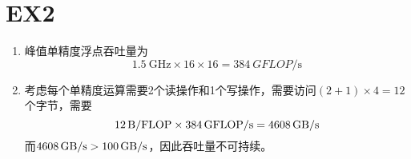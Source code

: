 \documentclass{article}
\begin{document}
    \section*{EX2}
    \begin{enumerate}
        \item 峰值单精度浮点吞吐量为
        \[\SI{1.5}{\giga\hertz} \times 16 \times 16 = \SI{384}{GFLOP\per\second}\]
        \item 考虑每个单精度运算需要2个读操作和1个写操作，需要访问$(2 + 1)\times 4 = 12$个字节，需要
        \[\SI{12}{\byte\per FLOP} \times \SI{384}{GFLOP\per\second} = \SI{4608}{{\giga\byte}\per\second}\]
        而$\SI{4608}{{\giga\byte}\per\second} > \SI{100}{{\giga\byte}\per\second}$，因此吞吐量不可持续。
    \end{enumerate}
\end{document}

